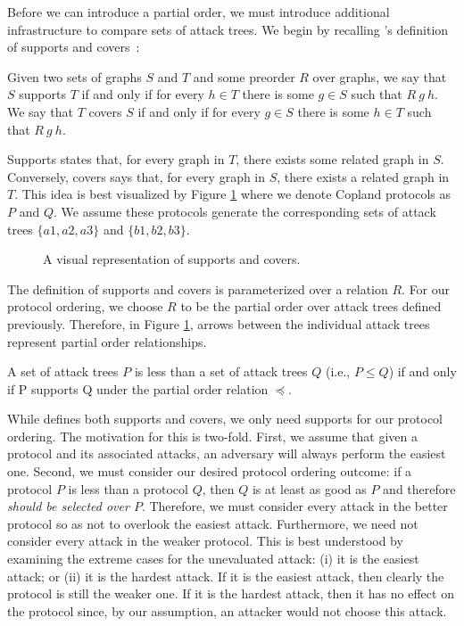 \documentclass[runningheads]{llncs}
\theoremstyle{definition}
\begin{document}
Before we can introduce a partial order, we must introduce additional
infrastructure to compare sets of attack trees. We begin by recalling
\citeauthor{Rowe:2021:OnOrdering}'s definition of supports and
covers~\citep{Rowe:2021:OnOrdering}: 

\begin{definition}
    Given two sets of graphs $S$ and $T$ and some preorder $R$ over
    graphs, we say that $S$ supports $T$ if and only if for every $h
    \in T$ there is some $g \in S$ such that $R\: g\: h$. We  say
    that $T$ covers $S$ if and only if for every $g \in S$ there is
    some $h \in T$ such that $R\: g\: h$. 
\end{definition}

Supports states that, for every graph in $T$, there exists some
related graph in $S$. Conversely, covers says that, for every graph in
$S$, there exists a related graph in $T$.  This idea is best
visualized by Figure \ref{fig:sup-cov} where we denote Copland
protocols as $P$ and $Q$. We assume these protocols generate the
corresponding sets of attack trees $\{a1, a2, a3 \}$ and
$ \{b1, b2 ,b3\}$.

\begin{figure}[htbp]
    \centering
    
    \captionsetup{justification=centering,margin=1cm}
    \caption[Supports and covers]{A visual representation of supports and covers.}
    \label{fig:sup-cov}
\end{figure}

The definition of supports and covers is parameterized over a relation
$R$. For our protocol ordering, we choose $R$ to be the partial order
over attack trees defined previously. Therefore, in Figure
\ref{fig:sup-cov}, arrows between the individual attack trees
represent partial order relationships. 

\begin{definition}
  A set of attack trees $P$ is less than a set of attack trees $Q$
  (i.e., $P \leq Q$) if and only if P supports Q under the partial
  order relation $\preceq$. 
\end{definition} 

While \citeauthor{Rowe:2021:OnOrdering} defines both supports and
covers, we only need supports for our protocol ordering. The
motivation for this is two-fold. First, we assume that given a protocol
and its associated attacks, an adversary will always perform the
easiest one.  Second, we must consider our desired protocol ordering
outcome: if a protocol $P$ is less than a protocol $Q$, then $Q$ is at
least as good as $P$ and therefore \emph{should be selected over
  $P$}. Therefore, we must consider every attack in the better
protocol so as not to overlook the easiest attack. Furthermore, we
need not consider every attack in the weaker protocol. This is best
understood by examining the extreme cases for the unevaluated attack:
(i) it is the easiest attack; or (ii) it is the hardest attack. If it
is the easiest attack, then clearly the protocol is still the weaker
one. If it is the hardest attack, then it has no effect on the
protocol since, by our assumption, an attacker would not choose this
attack.
\end{document}
